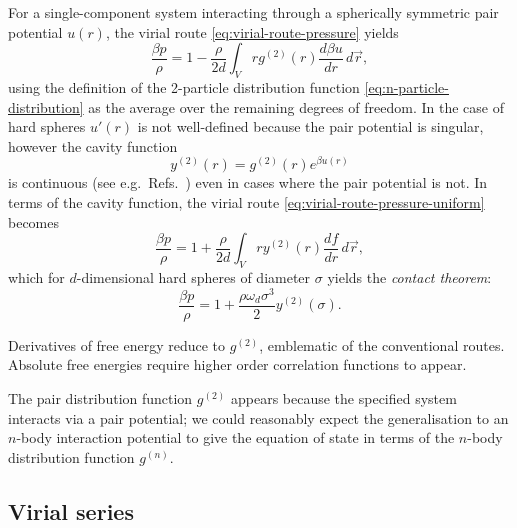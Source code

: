\begin{tcolorbox}[title=Contact theorem for hard spheres]
For a single-component system interacting through a spherically symmetric pair potential $u(r)$, the virial route \eqref{eq:virial-route-pressure} yields
\begin{equation}\label{eq:virial-route-pressure-uniform}
  \frac{\beta p}{\rho}
  =
  1
  -
  \frac{\rho}{2 d}
  \int_V
  r g^{(2)}(r) \frac{d \beta u}{d r} \, d\vec{r},
\end{equation}
using the definition of the 2-particle distribution function \eqref{eq:n-particle-distribution} as the average over the remaining degrees of freedom.
In the case of hard spheres $u'(r)$ is not well-defined because the pair potential is singular, however the cavity function
\begin{equation*}\label{eq:cavity-function}
  y^{(2)}(r) = g^{(2)}(r) e^{\beta u(r)}
\end{equation*}
is continuous (see e.g.\ Refs.\ \cite{Hansen2013,Santos2016}) even in cases where the pair potential is not.
In terms of the cavity function, the virial route \eqref{eq:virial-route-pressure-uniform} becomes
\begin{equation*}\label{eq:virial-route-pressure-cavity}
  \frac{\beta p}{\rho}
  =
  1
  +
  \frac{\rho}{2 d}
  \int_V
  r y^{(2)}(r) \frac{d f}{dr}
  \, d\vec{r},
\end{equation*}
which for $d$-dimensional hard spheres of diameter $\sigma$ yields the \emph{contact theorem}:
\begin{equation}
  \frac{\beta p}{\rho}
  =
  1
  +
  \frac{\rho \omega_d \sigma^3}{2}
  y^{(2)}(\sigma).
\end{equation}
\end{tcolorbox}

Derivatives of free energy reduce to $g^{(2)}$, emblematic of the conventional routes.
Absolute free energies require higher order correlation functions to appear.

The pair distribution function $g^{(2)}$ appears because the specified system interacts via a pair potential; we could reasonably expect the generalisation to an $n$-body interaction potential to give the equation of state in terms of the $n$-body distribution function $g^{(n)}$.

\subsection{Virial series}
\label{sec:virial-series}

